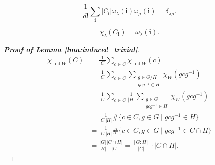 \documentclass[11pt]{homework}
\begin{document}
\begin{lemma}
    \label{lma:omega}
    \begin{equation*}
        \frac{1}{d!}\sum_{\mathbf{i}} |C_\mathbf{i}|\omega_\lambda(\mathbf{i}) \omega_\mu (\mathbf{i}) = \delta_{\lambda \mu}.
    \end{equation*}
\end{lemma}

\begin{proposition}
    \label{prop:final}
    \begin{equation*}
        \chi_\lambda (C_\mathbf{i}) = \omega_\lambda(\mathbf{i}).
    \end{equation*}
\end{proposition}




\begin{proof}[\normalfont\bfseries Proof of Lemma \ref{lma:induced_trivial}]
    
    \begin{align*}
        \chi_{\operatorname{Ind} W}(C) &= \frac{1}{|C|} \sum_{c \in C} \chi_{\operatorname{Ind} W}(c) \\
        &= \frac{1}{|C|} \sum_{c \in C} \sum_{\substack{g \in G/H \\ g c g^{-1} \in H}} \chi_{W}(g c g^{-1}) \\
        &= \frac{1}{|C|} \sum_{c \in C} \frac{1}{|H|} \sum_{\substack{g \in G\\ g c g^{-1} \in H}} \chi_{W}(g c g^{-1})\\
        &= \frac{1}{|C| |H|} \#\{ c \in C, g \in G \mid g c g^{-1} \in H \} \\
        &= \frac{1}{|C| |H|} \#\{ c \in C, g \in G \mid g c g^{-1} \in C\cap H \} \\
        &= \frac{|G|}{|H|} \frac{|C\cap H|}{|C|} = \frac{[G:H]}{|C|} \cdot |C\cap H|.
    \end{align*}
\end{proof}
\end{document}
